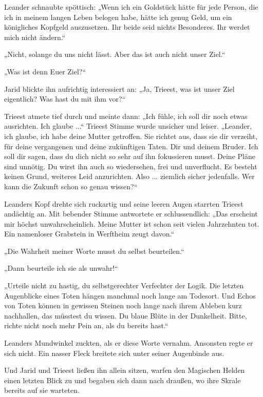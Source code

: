 Leander schnaubte spöttisch: „Wenn ich ein Goldstück hätte für jede Person, die ich in meinem langen Leben belogen habe, hätte ich genug Geld, um ein königliches Kopfgeld auszusetzen. Ihr beide seid nichts Besonderes. Ihr werdet mich nicht ändern.“

„Nicht, solange du uns nicht lässt. Aber das ist auch nicht unser Ziel.“

„Was ist denn Euer Ziel?“

Jarid blickte ihn aufrichtig interessiert an: „Ja, Trieest, was ist unser Ziel eigentlich? Was hast du mit ihm vor?“

Trieest atmete tief durch und meinte dann: „Ich fühle, ich soll dir noch etwas ausrichten. Ich glaube ...“ Trieest Stimme wurde unsicher und leiser. „Leander, ich glaube, ich habe deine Mutter getroffen. Sie richtet aus, dass sie dir verzeiht, für deine vergangenen und deine zukünftigen Taten. Dir und deinem Bruder. Ich soll dir sagen, dass du dich nicht so sehr auf ihn fokussieren musst. Deine Pläne sind unnötig. Du wirst ihn auch so wiedersehen, frei und unverflucht. Es besteht keinen Grund, weiteres Leid anzurichten. Also ... ziemlich sicher jedenfalls. Wer kann die Zukunft schon so genau wissen?“

Leanders Kopf drehte sich ruckartig und seine leeren Augen starrten Trieest andächtig an. Mit bebender Stimme antwortete er schlussendlich: „Das erscheint mir höchst unwahrscheinlich. Meine Mutter ist schon seit vielen Jahrzehnten tot. Ein namenloser Grabstein in Werftheim zeugt davon.“

„Die Wahrheit meiner Worte musst du selbst beurteilen.“

„Dann beurteile ich sie als unwahr!“

„Urteile nicht zu hastig, du selbstgerechter Verfechter der Logik. Die letzten Augenblicke eines Toten hängen manchmal noch lange am Todesort. Und Echos von Toten können in gewissen Steinen noch lange nach ihrem Ableben kurz nachhallen, das müsstest du wissen. Du blaue Blüte in der Dunkelheit. Bitte, richte nicht noch mehr Pein an, als du bereits hast.“

Leanders Mundwinkel zuckten, als er diese Worte vernahm. Ansonsten regte er sich nicht. Ein nasser Fleck breitete sich unter seiner Augenbinde aus.

Und Jarid und Trieest ließen ihn allein sitzen, warfen den Magischen Helden einen letzten Blick zu und begaben sich dann nach draußen, wo ihre Skrale bereits auf sie warteten.


